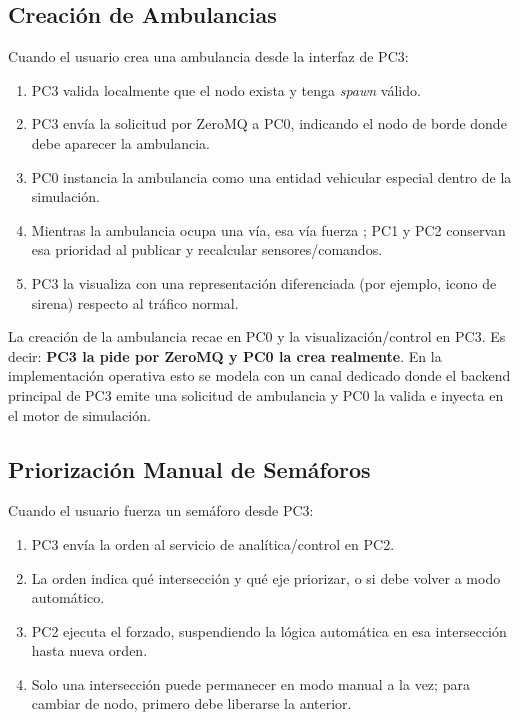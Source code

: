 \documentclass[12pt, a4paper]{article}
\let\oldtexttt\texttt
\renewcommand{\texttt}[1]{\oldtexttt{\seqsplit{#1}}}
\begin{document}
\subsection{Creación de Ambulancias}

Cuando el usuario crea una ambulancia desde la interfaz de PC3:

\begin{enumerate}
    \item PC3 valida localmente que el nodo \texttt{BORDE-X-X} exista y tenga \textit{spawn} válido.
    \item PC3 envía la solicitud por ZeroMQ a PC0, indicando el nodo de borde donde debe aparecer la ambulancia.
    \item PC0 instancia la ambulancia como una entidad vehicular especial dentro de la simulación.
    \item Mientras la ambulancia ocupa una vía, esa vía fuerza \texttt{score = 1.0}; PC1 y PC2 conservan esa prioridad al publicar y recalcular sensores/comandos.
    \item PC3 la visualiza con una representación diferenciada (por ejemplo, icono de sirena) respecto al tráfico normal.
\end{enumerate}

La creación de la ambulancia recae en PC0 y la visualización/control en PC3. Es decir: \textbf{PC3 la pide por ZeroMQ y PC0 la crea realmente}. En la implementación operativa esto se modela con un canal dedicado donde el backend principal de PC3 emite una solicitud de ambulancia y PC0 la valida e inyecta en el motor de simulación.

\subsection{Priorización Manual de Semáforos}

Cuando el usuario fuerza un semáforo desde PC3:

\begin{enumerate}
    \item PC3 envía la orden al servicio de analítica/control en PC2.
    \item La orden indica qué intersección y qué eje priorizar, o si debe volver a modo automático.
    \item PC2 ejecuta el forzado, suspendiendo la lógica automática en esa intersección hasta nueva orden.
    \item Solo una intersección puede permanecer en modo manual a la vez; para cambiar de nodo, primero debe liberarse la anterior.
\end{enumerate}
\end{document}
